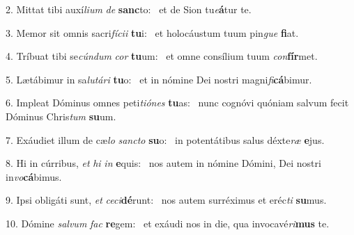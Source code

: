 2. Mittat tibi auxí\textit{li}\textit{um} \textit{de} \textbf{sanc}to: \ast\  et de Sion tu\textit{e}\textbf{á}tur te.\

3. Memor sit omnis sacri\textit{fí}\textit{ci}\textit{i} \textbf{tu}i: \ast\  et holocáustum tuum pin\textit{gue} \textbf{fi}at.\

4. Tríbuat tibi se\textit{cún}\textit{dum} \textit{cor} \textbf{tu}um: \ast\  et omne consílium tuum \textit{con}\textbf{fír}met.\

5. Lætábimur in sa\textit{lu}\textit{tá}\textit{ri} \textbf{tu}o: \ast\  et in nómine Dei nostri magni\textit{fi}\textbf{cá}bimur.\

6. Impleat Dóminus omnes peti\textit{ti}\textit{ó}\textit{nes} \textbf{tu}as: \ast\  nunc cognóvi quóniam salvum fecit Dóminus Chris\textit{tum} \textbf{su}um.\

7. Exáudiet illum de cæ\textit{lo} \textit{sanc}\textit{to} \textbf{su}o: \ast\  in potentátibus salus déxte\textit{ræ} \textbf{e}jus.\

8. Hi in cúrribus, \textit{et} \textit{hi} \textit{in} \textbf{e}quis: \ast\  nos autem in nómine Dómini, Dei nostri in\textit{vo}\textbf{cá}bimus.\

9. Ipsi obligáti sunt, \textit{et} \textit{ce}\textit{ci}\textbf{dé}runt: \ast\  nos autem surréximus et eréc\textit{ti} \textbf{su}mus.\

10. Dómine \textit{sal}\textit{vum} \textit{fac} \textbf{re}gem: \ast\  et exáudi nos in die, qua invocavé\textit{ri}\textbf{mus} te.\

